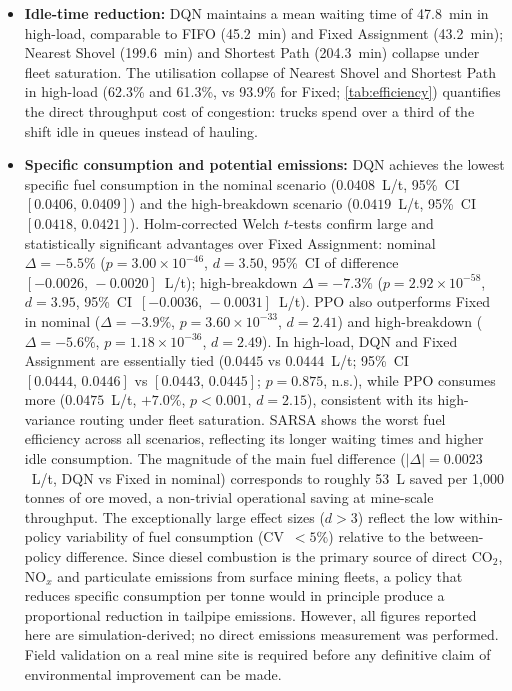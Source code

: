 \documentclass[11pt,a4paper]{article}
\begin{document}
\begin{itemize}
  \item \textbf{Idle-time reduction:} DQN maintains a mean waiting time of 47.8~min in high-load, comparable to FIFO (45.2~min) and Fixed Assignment (43.2~min); Nearest Shovel (199.6~min) and Shortest Path (204.3~min) collapse under fleet saturation. The utilisation collapse of Nearest Shovel and Shortest Path in high-load (62.3\% and 61.3\%, vs 93.9\% for Fixed; \cref{tab:efficiency}) quantifies the direct throughput cost of congestion: trucks spend over a third of the shift idle in queues instead of hauling.
  \item \textbf{Specific consumption and potential emissions:} DQN achieves the lowest specific fuel consumption in the nominal scenario ($0.0408$~L/t, 95\%~CI~$[0.0406,\,0.0409]$) and the high-breakdown scenario ($0.0419$~L/t, 95\%~CI~$[0.0418,\,0.0421]$). Holm-corrected Welch $t$-tests confirm large and statistically significant advantages over Fixed Assignment: nominal $\Delta=-5.5\%$ ($p=3.00\times10^{-46}$, $d=3.50$, 95\%~CI of difference~$[-0.0026,\,-0.0020]$~L/t); high-breakdown $\Delta=-7.3\%$ ($p=2.92\times10^{-58}$, $d=3.95$, 95\%~CI~$[-0.0036,\,-0.0031]$~L/t). PPO also outperforms Fixed in nominal ($\Delta=-3.9\%$, $p=3.60\times10^{-33}$, $d=2.41$) and high-breakdown ($\Delta=-5.6\%$, $p=1.18\times10^{-36}$, $d=2.49$). In high-load, DQN and Fixed Assignment are essentially tied ($0.0445$ vs $0.0444$~L/t; 95\%~CI~$[0.0444,\,0.0446]$ vs $[0.0443,\,0.0445]$; $p=0.875$, n.s.), while PPO consumes more ($0.0475$~L/t, $+7.0\%$, $p<0.001$, $d=2.15$), consistent with its high-variance routing under fleet saturation. SARSA shows the worst fuel efficiency across all scenarios, reflecting its longer waiting times and higher idle consumption. The magnitude of the main fuel difference ($|\Delta|=0.0023$~L/t, DQN vs Fixed in nominal) corresponds to roughly 53~L saved per 1,000 tonnes of ore moved, a non-trivial operational saving at mine-scale throughput. The exceptionally large effect sizes ($d>3$) reflect the low within-policy variability of fuel consumption (CV~$<5\%$) relative to the between-policy difference. Since diesel combustion is the primary source of direct CO$_2$, NO$_x$ and particulate emissions from surface mining fleets, a policy that reduces specific consumption per tonne would in principle produce a proportional reduction in tailpipe emissions. However, all figures reported here are simulation-derived; no direct emissions measurement was performed. Field validation on a real mine site is required before any definitive claim of environmental improvement can be made.
\end{itemize}
\end{document}
